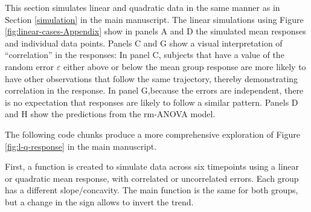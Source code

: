 \documentclass[
]{article}
\begin{document}
This section simulates linear and quadratic data in the same manner as in Section \ref{simulation} in the main manuscript. The linear simulations using Figure \ref{fig:linear-cases-Appendix} show in panels A and D the simulated mean responses and individual data points. Panels C and G show a visual interpretation of ``correlation'' in the responses: In panel C, subjects that have a value of the random error \(\varepsilon\) either above or below the mean group response are more likely to have other observations that follow the same trajectory, thereby demonstrating correlation in the response. In panel G,because the errors are independent, there is no expectation that responses are likely to follow a similar pattern. Panels D and H show the predictions from the rm-ANOVA model.

The following code chunks produce a more comprehensive exploration of Figure \ref{fig:l-q-response} in the main manuscript.

First, a function is created to simulate data across six timepoints using a linear or quadratic mean response, with correlated or uncorrelated errors. Each group has a different slope/concavity. The main function is the same for both groups, but a change in the sign allows to invert the trend.
\end{document}
